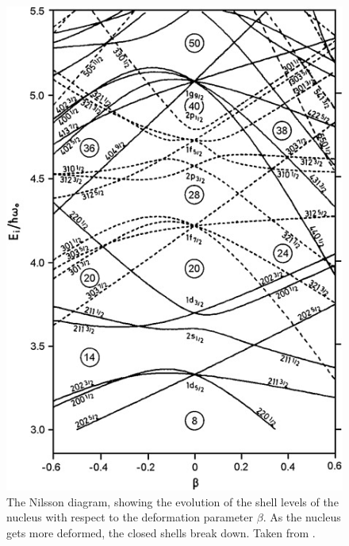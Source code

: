\begin{figure}[!tbp]
    \centering
    \includegraphics{Introduction_Figs/nilsson.jpg}
    \caption{The Nilsson diagram, showing the evolution of the shell levels of the nucleus with respect to the deformation parameter $\beta$. As the nucleus gets more deformed, the closed shells break down. Taken from \citep{choppin13:_nilsson}.}
    \label{fig:nilsson}
\end{figure}